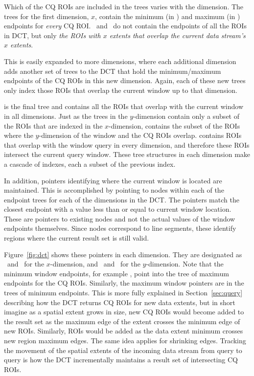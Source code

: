 \documentclass{ucdthesis}       %
\begin{document}
Which of the \ac{CQ} \acp{ROI} are included in the trees varies with the
dimension.  The trees for the first dimension, $x$, contain the
minimum (in \Xn) and maximum (in \Xx) endpoints for \emph{every}
\ac{CQ} \ac{ROI}.  \Yn\ and \Yx\ do not contain the endpoints of all the
\acp{ROI} in \ac{DCT}, but only \emph{the \acp{ROI} with $x$ extents that overlap
  the current data stream's $x$ extents}.

This is easily expanded to more dimensions, where each additional
dimension adds another set of trees to the \ac{DCT} that hold the
minimum/maximum endpoints of the \ac{CQ} \acp{ROI} in this new
dimension.  Again, each of these new trees only index those \acp{ROI}
that overlap the current window up to that dimension.

 is the final tree and contains all the \acp{ROI} that overlap with
the current window in all dimensions.  Just as the trees in the
$y$-dimension contain only a subset of the \acp{ROI} that are indexed in
the $x$-dimension,  contains the subset of the \acp{ROI} where the
$y$-dimension of the window and the \ac{CQ} \acp{ROI} overlap.  
contains \acp{ROI} that overlap with the window query in every
dimension, and therefore these \acp{ROI} intersect the current query
window.  These tree structures in each dimension make a cascade of
indexes, each a subset of the previous index.

In addition, pointers identifying where the current window is located
are maintained.  This is accomplished by pointing to nodes within each
of the endpoint trees for each of the dimensions in the \ac{DCT}.  The
pointers match the closest endpoint with a value less than or equal to
current window location.  These are pointers to existing nodes and not
the actual values of the window endpoints themselves.  Since nodes
correspond to line segments, these identify regions where the current
result set is still valid.

Figure~\ref{fig:dct} shows these pointers in each dimension.  They are
designated as \wxn\ and \wxx\ for the $x$-dimension, and \wyn\ and
\wyx\ for the $y$-dimension.  Note that the minimum window endpoints,
for example \wxn, point into the tree of maximum endpoints for the
\ac{CQ} \acp{ROI}.  Similarly, the maximum window pointers are in the
trees of minimum endpoints.  This is more fully explained in
Section~\ref{sec:query} describing how the \ac{DCT} returns \ac{CQ}
\acp{ROI} for new data extents, but in short imagine as a spatial extent
grows in size, new \ac{CQ} \acp{ROI} would become added to the result
set as the maximum edge of the extent crosses the minimum edge of new
\acp{ROI}.  Similarly, \acp{ROI} would be added as the data extent minimum
crosses new region maximum edges.  The same idea applies for shrinking
edges.  Tracking the movement of the spatial extents of the incoming
data stream from query to query is how the \ac{DCT} incrementally
maintains a result set of intersecting \ac{CQ} \acp{ROI}.
\end{document}
